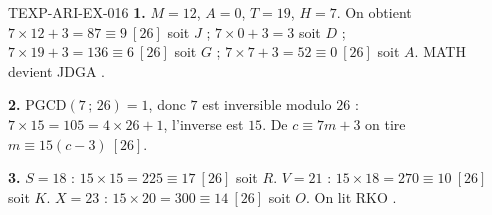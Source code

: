 \begin{corrige}{TEXP-ARI-EX-016}
\textbf{1.} $M=12$, $A=0$, $T=19$, $H=7$. On obtient
$7\times12+3=87\equiv9\ [26]$ soit $J$ ; $7\times0+3=3$ soit $D$ ;
$7\times19+3=136\equiv6\ [26]$ soit $G$ ; $7\times7+3=52\equiv0\ [26]$ soit
$A$. \og MATH \fg{} devient \og JDGA \fg.

\textbf{2.} $\mathrm{PGCD}(7\,;\,26)=1$, donc $7$ est inversible modulo $26$ :
$7\times15=105=4\times26+1$, l'inverse est $15$. De $c\equiv7m+3$ on tire
$m\equiv15(c-3)\ [26]$.

\textbf{3.} $S=18$ : $15\times15=225\equiv17\ [26]$ soit $R$.
$V=21$ : $15\times18=270\equiv10\ [26]$ soit $K$.
$X=23$ : $15\times20=300\equiv14\ [26]$ soit $O$. On lit \og RKO \fg.
\end{corrige}
